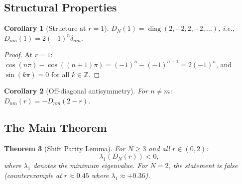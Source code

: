 \documentclass[12pt,a4paper]{article}
\newtheorem{theorem}{Theorem}[section]
\newtheorem{corollary}[theorem]{Corollary}
\theoremstyle{definition}
\theoremstyle{remark}
\begin{document}
\subsection{Structural Properties}

\begin{corollary}[Structure at $r = 1$]
\label{cor:r-one}
$D_N(1) = \operatorname{diag}(2, -2, 2, -2, \ldots)$, i.e., $D_{nm}(1) = 2(-1)^n \delta_{nm}$.
\end{corollary}

\begin{proof}
At $r = 1$: $\cos(n\pi) - \cos((n{+}1)\pi) = (-1)^n - (-1)^{n+1} = 2(-1)^n$, and $\sin(k\pi) = 0$ for all $k \in \mathbb{Z}$.
\end{proof}

\begin{corollary}[Off-diagonal antisymmetry]
\label{cor:antisym}
For $n \neq m$: $D_{nm}(r) = -D_{nm}(2-r)$.
\end{corollary}

\subsection{The Main Theorem}

\begin{theorem}[Shift Parity Lemma]
\label{thm:shift-parity}
For $N \geq 3$ and all $r \in (0, 2)$:
\[
  \lambda_1(D_N(r)) < 0,
\]
where $\lambda_1$ denotes the minimum eigenvalue. For $N = 2$, the statement is false (counterexample at $r \approx 0.45$ where $\lambda_1 \approx +0.36$).
\end{theorem}
\end{document}

